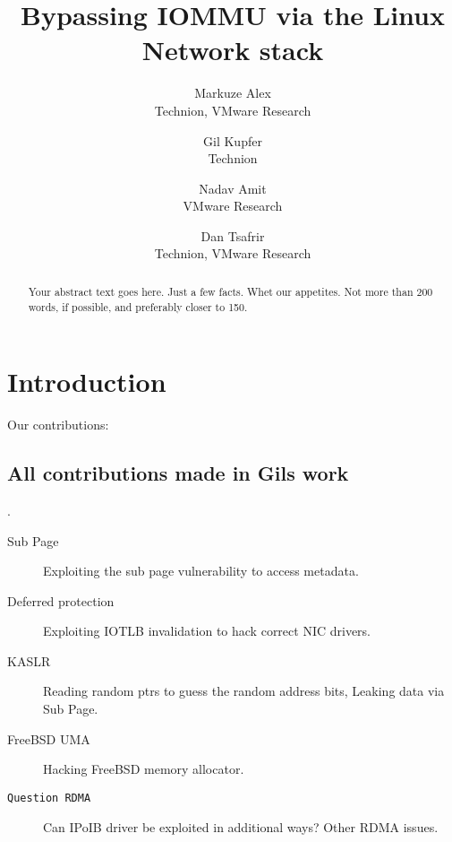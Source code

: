 \usepackage{filecontents}



\date{}

\title{\Large \bf Bypassing IOMMU via the Linux Network stack}

\author{
{\rm Markuze Alex}\\
Technion, VMware Research
\and
{\rm Gil Kupfer}\\
Technion
\and
{\rm Nadav Amit}\\
VMware Research
\and{\rm Dan Tsafrir}\\
Technion, VMware Research
} %

\maketitle

\begin{abstract}
Your abstract text goes here. Just a few facts. Whet our appetites.
Not more than 200 words, if possible, and preferably closer to 150.
\end{abstract}


\section{Introduction}
Our contributions:
\subsection{All contributions made in Gils work \cite{gil}}.

\begin{description}
  
\item[Sub Page] Exploiting the sub page vulnerability to access metadata.
\item[Deferred protection] Exploiting IOTLB invalidation to hack correct NIC drivers.
\item[KASLR] Reading random ptrs to guess the random address bits, Leaking data via Sub Page.
\item[FreeBSD UMA] Hacking FreeBSD memory allocator.
\item[\texttt{Question RDMA}] Can IPoIB driver be exploited in additional ways? Other RDMA issues.
\end{description}


